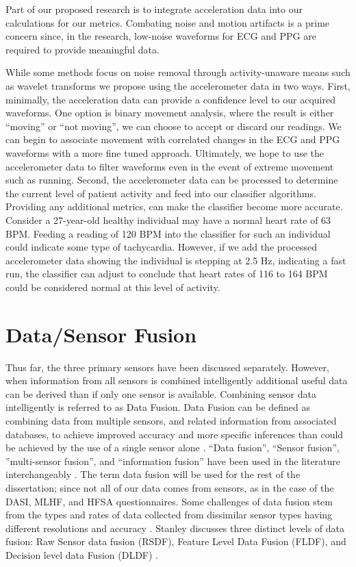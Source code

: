 Part of our proposed research is to integrate acceleration data into our calculations for our metrics. Combating noise  and motion artifacts is a prime concern since, in the research, low-noise waveforms for ECG and PPG are required to provide meaningful data.

While some methods focus on noise removal through activity-unaware means such as wavelet transforms \cite{Liu2011} we propose using the accelerometer data in two ways. First, minimally, the acceleration data can provide a confidence level to our acquired waveforms. One option is binary movement analysis, where the result is either “moving” or “not moving”, we can choose to accept or discard our readings. We can begin to associate movement with correlated changes in the ECG and PPG waveforms with a more fine tuned approach. Ultimately, we hope to use the accelerometer data to filter waveforms even in the event of extreme movement such as running. Second, the accelerometer data can be processed to determine the current level of patient activity and feed into our classifier algorithms. Providing any additional metrics, can make the classifier become more accurate. Consider a 27-year-old healthy individual may have a normal heart rate of 63 BPM. Feeding a reading of 120 BPM into the classifier for such an individual could indicate some type of tachycardia. However, if we add the processed accelerometer data showing the individual is stepping at 2.5 Hz, indicating a fast run, the classifier can adjust to conclude that heart rates of 116 to 164 BPM could be considered normal at this level of activity.

\section{Data/Sensor Fusion}
\label{sec:DataFusion}
Thus far, the three primary sensors have been discussed separately. However, when information from all sensors is combined intelligently additional useful data can be derived than if only one sensor is available.  Combining sensor data intelligently is referred to as Data Fusion. Data Fusion can be defined as combining data from multiple sensors, and related information from associated databases, to achieve improved accuracy and more specific inferences than could be achieved by the use of a single sensor alone \cite{Hall1997}.  “Data fusion”, “Sensor fusion”,  ”multi-sensor fusion”, and “information fusion” have been used in the literature interchangeably \cite{Crowley1993} \cite{Ceruti2006} \cite{Dantu2006} \cite{Dong2006} \cite{Durrant-Whyte2005} \cite{Qi2001} \cite{Stanley2007} \cite{Wu2002}. The term data fusion will be used for the rest of the dissertation; since not all of our data comes from sensors, as in the case of the DASI, MLHF, and HFSA questionnaires.  Some challenges of data fusion stem from the types and rates of data collected from dissimilar sensor types having different resolutions and accuracy \cite{Wu2002}.  Stanley discusses three distinct levels of data fusion: Raw Sensor data fusion (RSDF), Feature Level Data Fusion (FLDF), and Decision level data Fusion (DLDF) \cite{Stanley2007}.  

